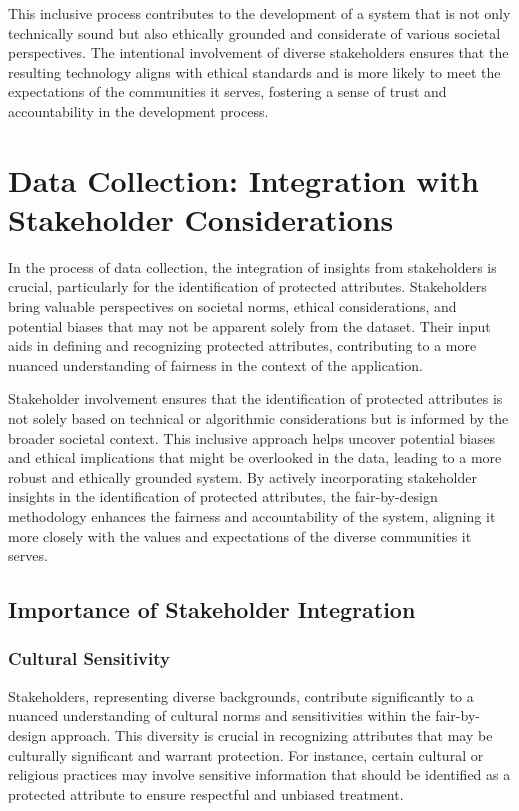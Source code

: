 This inclusive process contributes to the development of a system that is not only technically sound but also ethically grounded and considerate of various societal perspectives. The intentional involvement of diverse stakeholders ensures that the resulting technology aligns with ethical standards and is more likely to meet the expectations of the communities it serves, fostering a sense of trust and accountability in the development process.

\section{Data Collection: Integration with Stakeholder Considerations}
\label{section:data-collection}

In the process of data collection, the integration of insights from stakeholders is crucial, particularly for the identification of protected attributes. Stakeholders bring valuable perspectives on societal norms, ethical considerations, and potential biases that may not be apparent solely from the dataset. Their input aids in defining and recognizing protected attributes, contributing to a more nuanced understanding of fairness in the context of the application.

Stakeholder involvement ensures that the identification of protected attributes is not solely based on technical or algorithmic considerations but is informed by the broader societal context. This inclusive approach helps uncover potential biases and ethical implications that might be overlooked in the data, leading to a more robust and ethically grounded system. By actively incorporating stakeholder insights in the identification of protected attributes, the fair-by-design methodology enhances the fairness and accountability of the system, aligning it more closely with the values and expectations of the diverse communities it serves.

\subsection{Importance of Stakeholder Integration}

\subsubsection{Cultural Sensitivity}

Stakeholders, representing diverse backgrounds, contribute significantly to a nuanced understanding of cultural norms and sensitivities within the fair-by-design approach. This diversity is crucial in recognizing attributes that may be culturally significant and warrant protection. For instance, certain cultural or religious practices may involve sensitive information that should be identified as a protected attribute to ensure respectful and unbiased treatment.

